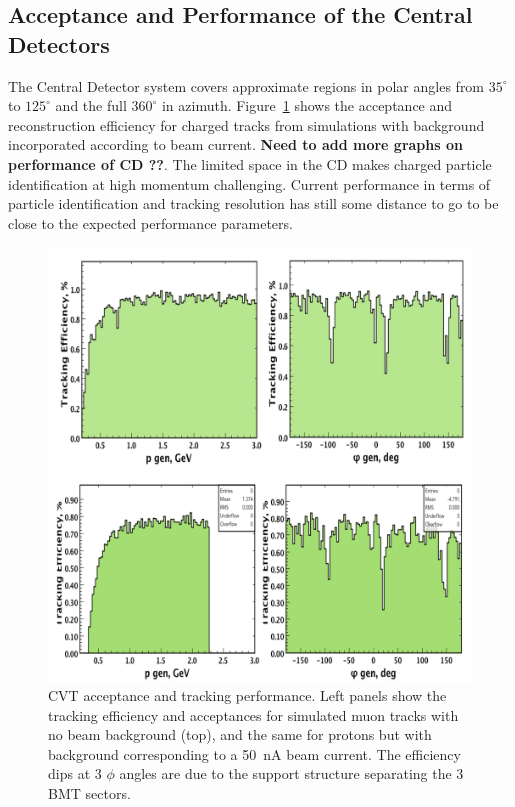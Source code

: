 \documentclass[final,3p,twocolumn]{elsarticle}
\begin{document}
\subsection{Acceptance and Performance of the Central Detectors} 

The Central Detector system covers approximate regions in polar angles from $35^\circ$ to $125^\circ$ and the
full $360^\circ$ in azimuth.  Figure~\ref{cvt-acceptance} shows the acceptance and reconstruction efficiency for
charged tracks from simulations with background incorporated according to beam current. {\bf Need to add
more graphs on performance of CD ??}. The limited space in the CD makes charged particle identification at high
momentum challenging. Current performance in terms of particle identification and tracking resolution has still some
distance to go to be close to the expected performance parameters.   

\begin{figure}[thbp!]
\centerline{\includegraphics[width=1.0\columnwidth]{cvt-acceptance.png}}
\caption{CVT acceptance and tracking performance. Left panels show the tracking efficiency and acceptances for 
simulated muon tracks with no beam background (top), and the same for protons but with background corresponding
to a 50~nA beam current. The efficiency dips at 3 $\phi$ angles are due to the support structure separating the 3
BMT sectors.}
\label{cvt-acceptance}
\end{figure}
\end{document}

